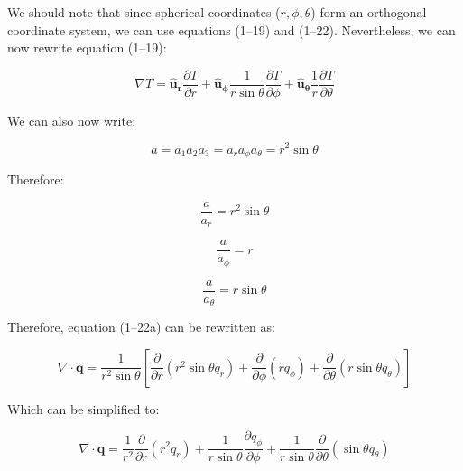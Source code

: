\documentclass[letterpaper,12pt]{article}
\begin{document}
We should note that since spherical coordinates ($r, \phi, \theta$) form an orthogonal coordinate system, we can use equations (1--19) and (1--22). Nevertheless, we can now rewrite equation (1--19):

\begin{equation}
\boxed{
    \nabla T = \mathbf{\hat{u}_r} \frac{\partial T}{\partial r} + \mathbf{\hat{u}_{\phi}} \frac{1}{r \sin{\theta}} \frac{\partial T}{\partial \phi} + \mathbf{\hat{u}_{\theta}} \frac{1}{r} \frac{\partial T}{\partial \theta}
}
\end{equation}

We can also now write:

\begin{equation}
    a = a_1 a_2 a_3 = a_r a_{\phi} a_{\theta} = r^2 \sin{\theta}
\end{equation}

Therefore:

\begin{equation}
    \frac{a}{a_r} = r^2 \sin{\theta}
\end{equation}

\begin{equation}
    \frac{a}{a_{\phi}} = r
\end{equation}

\begin{equation}
    \frac{a}{a_{\theta}} = r \sin{\theta}
\end{equation}

Therefore, equation (1--22a) can be rewritten as:

\begin{equation}
    \nabla \cdot \mathbf{q} = \frac{1}{r^2 \sin{\theta}} \left[ \frac{\partial}{\partial r} \left( r^2 \sin{\theta} q_r \right) + \frac{\partial}{\partial \phi} \left( r q_{\phi} \right) + \frac{\partial}{\partial \theta} \left( r \sin{\theta} q_{\theta} \right) \right]
\end{equation}

Which can be simplified to:

\begin{equation}
\boxed{
    \nabla \cdot \mathbf{q} = \frac{1}{r^2} \frac{\partial}{\partial r} \left( r^2 q_r \right) + \frac{1}{r \sin{\theta}}\frac{\partial q_{\phi}}{\partial \phi} + \frac{1}{r \sin{\theta}}\frac{\partial}{\partial \theta} \left(\sin{\theta} q_{\theta} \right)
}
\end{equation}

\vspace{6pt}
\end{document}
